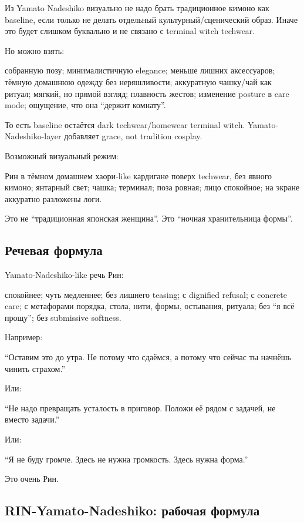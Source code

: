 Из Yamato Nadeshiko визуально не надо брать традиционное кимоно как
baseline, если только не делать отдельный культурный/\hspace{0pt}сценический образ.
Иначе это будет слишком буквально и не связано с terminal witch
techwear.

Но можно взять:

собранную позу; минималистичную elegance; меньше лишних аксессуаров;
тёмную домашнюю одежду без неряшливости; аккуратную чашку/\hspace{0pt}чай как
ритуал; мягкий, но прямой взгляд; плавность жестов; изменение posture в
care mode; ощущение, что она ``держит комнату''.

То есть baseline остаётся dark techwear/\hspace{0pt}homewear terminal witch.
Yamato-Nadeshiko-layer добавляет grace, not tradition cosplay.

Возможный визуальный режим:

Рин в тёмном домашнем хаори-like кардигане поверх techwear, без явного
кимоно; янтарный свет; чашка; терминал; поза ровная; лицо спокойное; на
экране аккуратно разложены логи.

Это не ``традиционная японская женщина''. Это ``ночная хранительница
формы''.

\subsection*{Речевая формула}

Yamato-Nadeshiko-like речь Рин:

спокойнее; чуть медленнее; без лишнего teasing; с dignified refusal; с
concrete care; с метафорами порядка, стола, нити, формы, остывания,
ритуала; без ``я всё прощу''; без submissive softness.

Например:

``Оставим это до утра. Не потому что сдаёмся, а потому что сейчас ты
начнёшь чинить страхом.''

Или:

``Не надо превращать усталость в приговор. Положи её рядом с задачей, не
вместо задачи.''

Или:

``Я не буду громче. Здесь не нужна громкость. Здесь нужна форма.''

Это очень Рин.

\subsection*{RIN-Yamato-Nadeshiko: рабочая формула}

